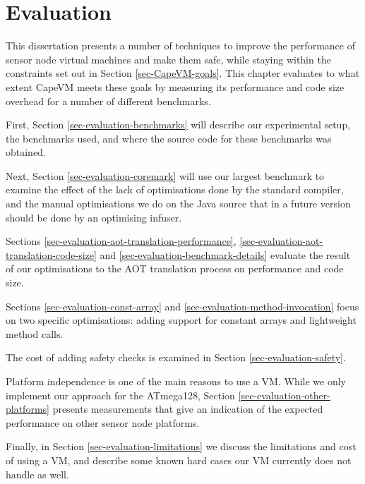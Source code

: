 \chapter{Evaluation}
\label{sec-evaluation}
This dissertation presents a number of techniques to improve the performance of sensor node virtual machines and make them safe, while staying within the constraints set out in Section \ref{sec-CapeVM-goals}. This chapter evaluates to what extent CapeVM meets these goals by measuring its performance and code size overhead for a number of different benchmarks.

First, Section \ref{sec-evaluation-benchmarks} will describe our experimental setup, the benchmarks used, and where the source code for these benchmarks was obtained.

Next, Section \ref{sec-evaluation-coremark} will use our largest benchmark to examine the effect of the lack of optimisations done by the standard  compiler, and the manual optimisations we do on the Java source that in a future version should be done by an optimising infuser.

Sections \ref{sec-evaluation-aot-translation-performance}, \ref{sec-evaluation-aot-translation-code-size} and \ref{sec-evaluation-benchmark-details} evaluate the result of our optimisations to the AOT translation process on performance and code size.

Sections \ref{sec-evaluation-const-array} and \ref{sec-evaluation-method-invocation} focus on two specific optimisations: adding support for constant arrays and lightweight method calls.

The cost of adding safety checks is examined in Section \ref{sec-evaluation-safety}.

Platform independence is one of the main reasons to use a VM. While we only implement our approach for the ATmega128, Section \ref{sec-evaluation-other-platforms} presents measurements that give an indication of the expected performance on other sensor node platforms.

Finally, in Section \ref{sec-evaluation-limitations} we discuss the limitations and cost of using a VM, and describe some known hard cases our VM currently does not handle as well.
